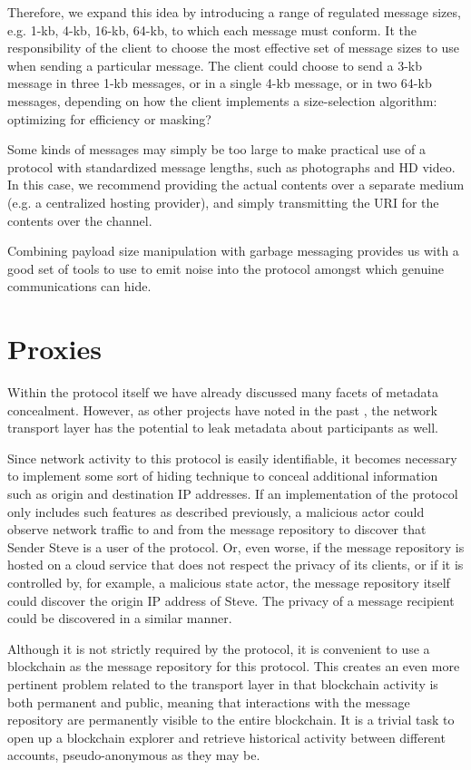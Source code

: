 Therefore, we expand this idea by introducing a range of regulated message sizes, e.g. 1-kb, 4-kb, 16-kb, 64-kb, to which each message must conform. It the responsibility of the client to choose the most effective set of message sizes to use when sending a particular message. The client could choose to send a 3-kb message in three 1-kb messages, or in a single 4-kb message, or in two 64-kb messages, depending on how the client implements a size-selection algorithm: optimizing for efficiency or masking?

Some kinds of messages may simply be too large to make practical use of a protocol with standardized message lengths, such as photographs and HD video. In this case, we recommend providing the actual contents over a separate medium (e.g. a centralized hosting provider), and simply transmitting the URI for the contents over the channel.

Combining payload size manipulation with garbage messaging provides us with a good set of tools to use to emit noise into the protocol amongst which genuine communications can hide.

\section{Proxies}\label{proxies}

Within the protocol itself we have already discussed many facets of metadata concealment. However, as other projects have noted in the past \parencite{erciccione_blog_2020, dingledine_tor_2004}, the network transport layer has the potential to leak metadata about participants as well.

Since network activity to this protocol is easily identifiable, it becomes necessary to implement some sort of hiding technique to conceal additional information such as origin and destination IP addresses. If an implementation of the protocol only includes such features as described previously, a malicious actor could observe network traffic to and from the message repository to discover that Sender Steve is a user of the protocol. Or, even worse, if the message repository is hosted on a cloud service that does not respect the privacy of its clients, or if it is controlled by, for example, a malicious state actor, the message repository itself could discover the origin IP address of Steve. The privacy of a message recipient could be discovered in a similar manner.

Although it is not strictly required by the protocol, it is convenient to use a blockchain as the message repository for this protocol. This creates an even more pertinent problem related to the transport layer in that blockchain activity is both permanent and public, meaning that interactions with the message repository are permanently visible to the entire blockchain. It is a trivial task to open up a blockchain explorer and retrieve historical activity between different accounts, pseudo-anonymous as they may be.

